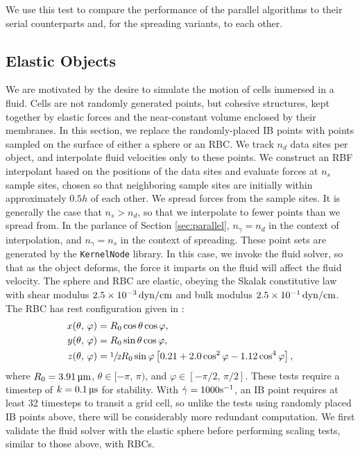 We use this test to compare the performance of the parallel algorithms to their serial
counterparts and, for the spreading variants, to each other.





\subsection{Elastic Objects}

We are motivated by the desire to simulate the motion of cells immersed in a fluid. Cells
are not randomly generated points, but cohesive structures, kept together by elastic
forces and the near-constant volume enclosed by their membranes. In this section, we
replace the randomly-placed IB points with points sampled on the surface of either a
sphere or an RBC. We track $n_d$ data sites per object, and interpolate fluid velocities
only to these points. We construct an RBF interpolant based on the positions of the data
sites and evaluate forces at $n_s$ sample sites, chosen so that neighboring sample sites
are initially within approximately $0.5h$ of each other. We spread forces from the sample
sites. It is generally the case that $n_s > n_d$, so that we interpolate to fewer points
than we spread from. In the parlance of Section \ref{sec:parallel}, $n_\gamma=n_d$ in the
context of interpolation, and $n_\gamma=n_s$ in the context of spreading. These point
sets are generated by the \texttt{KernelNode} library. In this case, we invoke the fluid
solver, so that as the object deforms, the force it imparts on the fluid will affect the
fluid velocity. The sphere and RBC are elastic, obeying the Skalak constitutive law
\cite{Skalak:1973tp} with shear modulus $2.5\times10^{-3}\dynpercm$ and bulk modulus
$2.5\times10^{-1}\dynpercm$. The RBC has rest configuration given in \cite{Omori:2012hw}:
\begin{equation}
    \begin{aligned}
        x(\theta,\,\varphi) &= R_0\cos\theta\cos\varphi, \\
        y(\theta,\,\varphi) &= R_0\sin\theta\cos\varphi, \\
        z(\theta,\,\varphi) &= \sfrac12 R_0\sin\varphi\left[0.21 + 2.0 \cos^2\varphi -1.12 \cos^4\varphi\right],
    \end{aligned}
\end{equation}
where $R_0=3.91\um$, $\theta\in[-\pi,\,\pi)$, and $\varphi\in[-\pi/2,\,\pi/2]$. These
tests require a timestep of $k=0.1\us$ for stability. With $\dot{\gamma}=1000\si{\per\second}$,
an IB point requires at least 32 timesteps to transit a grid cell, so unlike the tests
using randomly placed IB points above, there will be considerably more redundant
computation. We first validate the fluid solver with the elastic sphere before performing
scaling tests, similar to those above, with RBCs.





